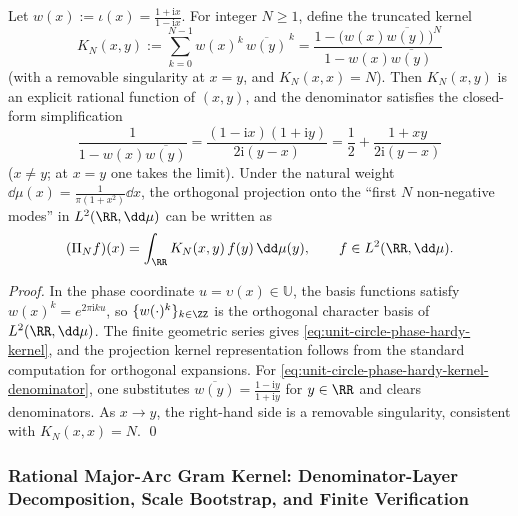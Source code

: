 \begin{proposition}\label{prop:unit-circle-phase-hardy-kernel-rational}
Let
\(
w(x):=\iota(x)=\frac{1+\mathrm{i}x}{1-\mathrm{i}x}
\).
For integer \(N\ge 1\), define the truncated kernel
\begin{equation}\label{eq:unit-circle-phase-hardy-kernel}
\boxed{\;
K_N(x,y):=\sum_{k=0}^{N-1} w(x)^k\,\overline{w(y)}^{\,k}
=\frac{1-\bigl(w(x)\overline{w(y)}\bigr)^N}{1-w(x)\overline{w(y)}}\;}
\end{equation}
(with a removable singularity at \(x=y\), and \(K_N(x,x)=N\)).
Then \(K_N(x,y)\) is an explicit rational function of \((x,y)\), and the denominator satisfies the closed-form simplification
\begin{equation}\label{eq:unit-circle-phase-hardy-kernel-denominator}
\boxed{\;
\frac{1}{1-w(x)\overline{w(y)}}
=\frac{(1-\mathrm{i}x)(1+\mathrm{i}y)}{2\mathrm{i}(y-x)}
=\frac12+\frac{1+xy}{2\mathrm{i}(y-x)}\;}
\end{equation}
(\(x\neq y\); at \(x=y\) one takes the limit).
Under the natural weight \(\dd\mu(x)=\frac{1}{\pi(1+x^2)}\dd x\), the orthogonal projection onto the ``first \(N\) non-negative modes'' in \(L^2(\RR,\dd\mu)\) can be written as
\[
(\Pi_N f)(x)=\int_{\RR} K_N(x,y)\,f(y)\,\dd\mu(y),
\qquad f\in L^2(\RR,\dd\mu).
\]
\end{proposition}
\begin{proof}
In the phase coordinate \(u=\upsilon(x)\in\mathbb{U}\), the basis functions satisfy \(w(x)^k=e^{2\pi\mathrm{i}ku}\), so \(\{w(\cdot)^k\}_{k\in\ZZ}\) is the orthogonal character basis of \(L^2(\RR,\dd\mu)\).
The finite geometric series gives \eqref{eq:unit-circle-phase-hardy-kernel}, and the projection kernel representation follows from the standard computation for orthogonal expansions.
For \eqref{eq:unit-circle-phase-hardy-kernel-denominator}, one substitutes \(\overline{w(y)}=\frac{1-\mathrm{i}y}{1+\mathrm{i}y}\) for \(y\in\RR\) and clears denominators.
As \(x\to y\), the right-hand side is a removable singularity, consistent with \(K_N(x,x)=N\). \qed
\end{proof}

\subsubsection{Rational Major-Arc Gram Kernel: Denominator-Layer Decomposition, Scale Bootstrap, and Finite Verification}\label{subsubsec:unit-circle-rational-gram-bootstrap}

